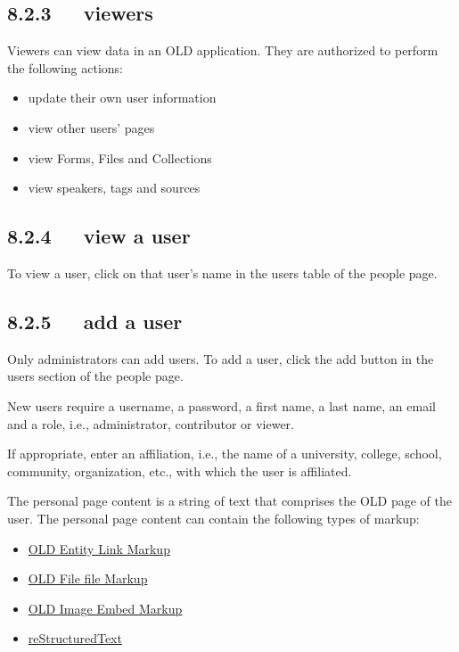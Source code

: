 \documentclass[letterpaper,10pt,english]{sphinxmanual}
\begin{document}
\subsection{8.2.3   viewers}
\label{documentation:viewers}
Viewers can view data in an OLD application.  They are authorized to perform
the following actions:
\begin{itemize}
\item {} 
update their own user information

\item {} 
view other users' pages

\item {} 
view Forms, Files and Collections

\item {} 
view speakers, tags and sources

\end{itemize}


\subsection{8.2.4   view a user}
\label{documentation:view-a-user}
To view a user, click on that user's name in the users table of the people page.


\subsection{8.2.5   add a user}
\label{documentation:add-a-user}
Only administrators can add users.  To add a user, click the add button in the
users section of the people page.

New users require a username, a password, a first name, a last name, an email
and a role, i.e., administrator, contributor or viewer.

If appropriate, enter an affiliation, i.e., the name of a university, college,
school, community, organization, etc., with which the user is affiliated.

The personal page content is a string of text that comprises the OLD page of the
user.  The personal page content can contain the following types of markup:
\begin{itemize}
\item {} 
{\hyperref[documentation:old-entity-link-markup]{OLD Entity Link Markup}}

\item {} 
{\hyperref[documentation:old-file-file-markup]{OLD File file Markup}}

\item {} 
{\hyperref[documentation:old-image-embed-markup]{OLD Image Embed Markup}}

\item {} 
{\hyperref[documentation:restructuredtext]{reStructuredText}}

\end{itemize}
\end{document}
